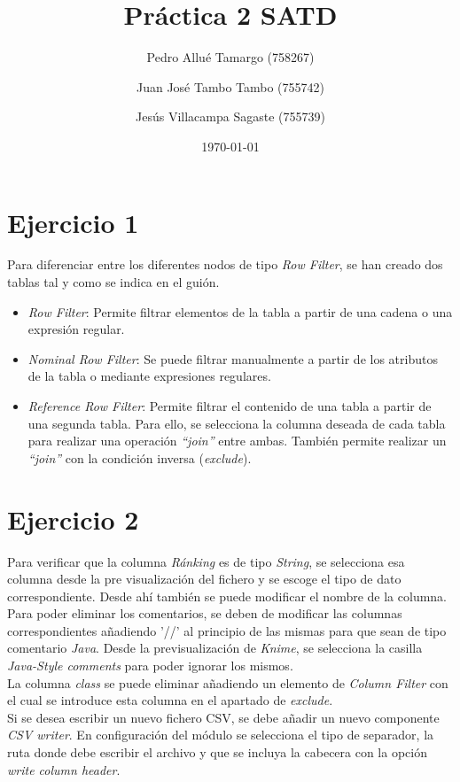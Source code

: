 \documentclass[10pt,a4paper]{article}
\begin{document}
\begin{titlepage}
\title{\textbf{{\Huge Práctica 2 SATD}}}
\author{
	Pedro Allué Tamargo (758267)
	\and
	Juan José Tambo Tambo (755742)
	\and
	Jesús Villacampa Sagaste (755739)
}
\date{\today}
\clearpage\maketitle
\thispagestyle{empty}
\tableofcontents
\end{titlepage}

\section{Ejercicio 1}

Para diferenciar entre los diferentes nodos de tipo \textit{Row Filter}, se han creado dos tablas tal y como se indica en el guión. 
\begin{itemize}
\item\textit{Row Filter}: Permite filtrar elementos de la tabla a partir de una cadena o una expresión regular.
\item\textit{Nominal Row Filter}: Se puede filtrar manualmente a partir de los atributos de la tabla o mediante expresiones regulares.
\item\textit{Reference Row Filter}: Permite filtrar el contenido de una tabla a partir de una segunda tabla. Para ello, se selecciona la columna deseada de cada tabla para realizar una operación \emph{``join''} entre ambas. También permite realizar un \emph{``join''} con la condición inversa (\textit{exclude}).  
\end{itemize}

\section{Ejercicio 2}

Para verificar que la columna \textit{Ránking} es de tipo \textit{String}, se selecciona esa columna desde la  pre visualización del fichero y se escoge el tipo de dato correspondiente. Desde ahí también se puede modificar el nombre de la columna. \\
Para poder eliminar los comentarios, se deben de modificar las columnas correspondientes añadiendo '//' al principio de las mismas para que sean de tipo comentario \textit{Java}. Desde la previsualización de \textit{Knime}, se selecciona la casilla \textit{Java-Style comments} para poder ignorar los mismos.\\
La columna \textit{class} se puede eliminar añadiendo un elemento de \textit{Column Filter} con el cual se introduce esta columna en el apartado de \textit{exclude}.\\
Si se desea escribir un nuevo fichero CSV, se debe añadir un nuevo componente \textit{CSV writer}. En configuración del módulo se selecciona el tipo de separador, la ruta donde debe escribir el archivo y que se incluya la cabecera con la opción \textit{write column header}.
\end{document}
